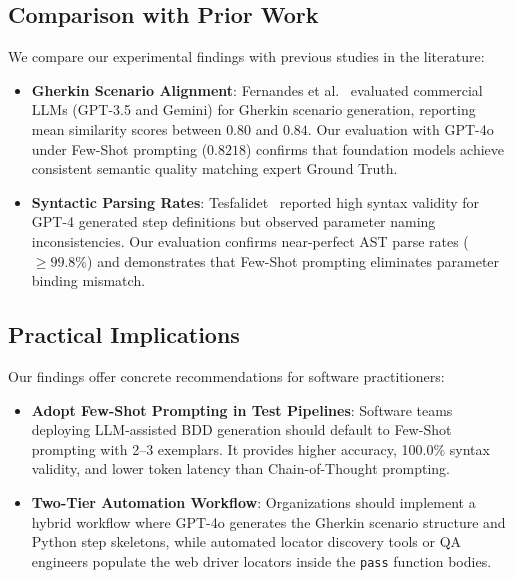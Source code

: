 \subsection{Comparison with Prior Work}
We compare our experimental findings with previous studies in the literature:
\begin{itemize}
    \item \textbf{Gherkin Scenario Alignment}: Fernandes et al.~\cite{fernandes2024} evaluated commercial LLMs (GPT-3.5 and Gemini) for Gherkin scenario generation, reporting mean similarity scores between $0.80$ and $0.84$. Our evaluation with GPT-4o under Few-Shot prompting ($0.8218$) confirms that foundation models achieve consistent semantic quality matching expert Ground Truth.
    \item \textbf{Syntactic Parsing Rates}: Tesfalidet~\cite{tesfalidet2025} reported high syntax validity for GPT-4 generated step definitions but observed parameter naming inconsistencies. Our evaluation confirms near-perfect AST parse rates ($\ge 99.8\%$) and demonstrates that Few-Shot prompting eliminates parameter binding mismatch.
\end{itemize}

\subsection{Practical Implications}
Our findings offer concrete recommendations for software practitioners:
\begin{itemize}
    \item \textbf{Adopt Few-Shot Prompting in Test Pipelines}: Software teams deploying LLM-assisted BDD generation should default to Few-Shot prompting with 2--3 exemplars. It provides higher accuracy, 100.0\% syntax validity, and lower token latency than Chain-of-Thought prompting.
    \item \textbf{Two-Tier Automation Workflow}: Organizations should implement a hybrid workflow where GPT-4o generates the Gherkin scenario structure and Python step skeletons, while automated locator discovery tools or QA engineers populate the web driver locators inside the \texttt{pass} function bodies.
\end{itemize}
